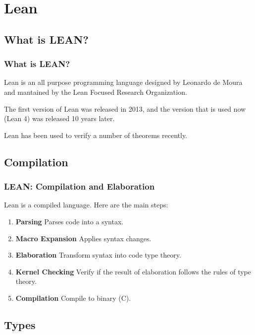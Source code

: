 \documentclass{beamer}
\begin{document}
\section{Lean}

\subsection{What is LEAN?}

\begin{frame}
  \frametitle{What is LEAN?}

  Lean is an all purpose programming language designed by Leonardo de Moura and mantained by the Lean Focused Research Organization.

  \vspace{5mm}

  The first version of Lean was released in 2013, and the version that is used now (Lean 4) was released 10 years later.

  \vspace{5mm}

  Lean has been used to verify a number of theorems recently.

\end{frame}

\subsection{Compilation}

\begin{frame}
  \frametitle{LEAN: Compilation and Elaboration}

  Lean is a compiled language. Here are the main steps:

  \begin{enumerate}
    \item \textbf{Parsing} Parses code into a syntax.
    \item \textbf{Macro Expansion} Applies syntax changes.
    \item \textbf{Elaboration} Transform syntax into code type theory.
    \item \textbf{Kernel Checking} Verify if the result of elaboration follows the rules of type theory.
    \item \textbf{Compilation} Compile to binary (C).
  \end{enumerate}
\end{frame}

\subsection{Types}
\end{document}
